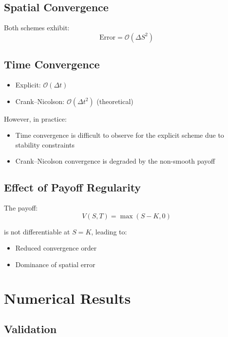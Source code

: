 \documentclass[11pt]{article}
\begin{document}
\subsection{Spatial Convergence}

Both schemes exhibit:
\begin{equation}
\text{Error} = \mathcal{O}(\Delta S^2)
\end{equation}

\subsection{Time Convergence}

\begin{itemize}
    \item Explicit: $\mathcal{O}(\Delta t)$
    \item Crank--Nicolson: $\mathcal{O}(\Delta t^2)$ (theoretical)
\end{itemize}

However, in practice:

\begin{itemize}
    \item Time convergence is difficult to observe for the explicit scheme due to stability constraints
    \item Crank--Nicolson convergence is degraded by the non-smooth payoff
\end{itemize}

\subsection{Effect of Payoff Regularity}

The payoff:
\begin{equation}
V(S,T) = \max(S-K,0)
\end{equation}

is not differentiable at $S=K$, leading to:
\begin{itemize}
    \item Reduced convergence order
    \item Dominance of spatial error
\end{itemize}

\section{Numerical Results}

\subsection{Validation}
\end{document}
